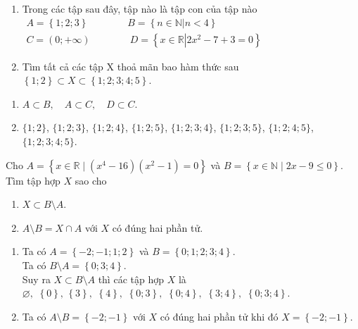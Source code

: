 \begin{bt}%
	\begin{enumerate}
		\item Trong các tập sau đây, tập nào là tập con của tập nào\\
		$\begin{array}{l}
			A=\left\{{1;2;3}\right\}\quad\quad\quad\quad B=\left\{{n\in \mathbb{N}\left|n < 4\right.}\right\}\\
			C=\left(0;+\infty\right)\quad\quad\quad\quad D=\left\{{x\in \mathbb{R}\left|2x^2-7+3=0\right.}\right\}
		\end{array}$
		\item Tìm tất cả các tập X thoả mãn bao hàm thức sau\\
		$\left\{{1;2}\right\}\subset X\subset\left\{{1;2;3;4;5}\right\}$.
	\end{enumerate}
	\loigiai
	{
		\begin{enumerate}
			\item $A\subset B,\quad A\subset C,\quad D\subset C$.
			\item $\{1;2\}$, $\{1;2;3\}$, $\{1;2;4\}$, $\{1;2;5\}$, $\{1;2;3;4\}$, $\{1;2;3;5\}$, $\{1;2;4;5\}$, $\{1;2;3;4;5\}$.
		\end{enumerate}
	}
\end{bt}

\begin{bt}%
	Cho $A=\left\{x \in \mathbb{R} \mid\left(x^4-16\right)\left(x^2-1\right)=0\right\}$ và $ B=\left\{{x\in \mathbb{N}\mid 2x-9\le 0}\right\}$. Tìm tập hợp $ X$ sao cho
	\begin{enumerate}
		\item $X\subset B\setminus A$.
		\item $ A\setminus B=X\cap A$ với $ X$ có đúng hai phần tử.
	\end{enumerate}
	\loigiai
	{
		\begin{enumerate}
			\item Ta có $A=\left\{{-2;-1;1;2}\right\}$ và $ B=\left\{{0;1;2;3;4}\right\}$.\\
			Ta có $ B\setminus A=\left\{{0;3;4}\right\}$.\\
			Suy ra $X\subset B\setminus A$ thì các tập hợp $X$ là\\
			$\varnothing ,\,\,\left\{ 0\right\},\,\left\{ 3\right\},\,\,\left\{ 4\right\},\,\,\left\{{0;3}\right\},\,\,\left\{{0;4}\right\},\,\,\left\{{3;4}\right\},\,\,\left\{{0;3;4}\right\}$.
			\item Ta có $ A\setminus B=\left\{{-2;-1}\right\}$ với $ X$ có đúng hai phần tử khi đó $ X=\left\{{-2;-1}\right\}$.
		\end{enumerate}
	}
\end{bt}

